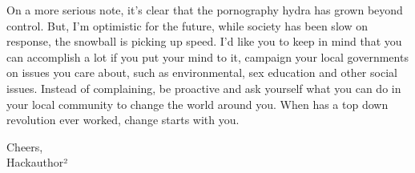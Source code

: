 \documentclass[easypeasy.tex]{subfiles}
\begin{document}
On a more serious note, it's clear that the pornography hydra has grown beyond control. But, I'm optimistic for the future, while society has been slow on response, the snowball is picking up speed. I'd like you to keep in mind that you can accomplish a lot if you put your mind to it, campaign your local governments on issues you care about, such as environmental, sex education and other social issues. Instead of complaining, be proactive and ask yourself what you can do in your local community to change the world around you. When has a top down revolution ever worked, change starts with you.

Cheers,\\
Hackauthor²
\end{document}
